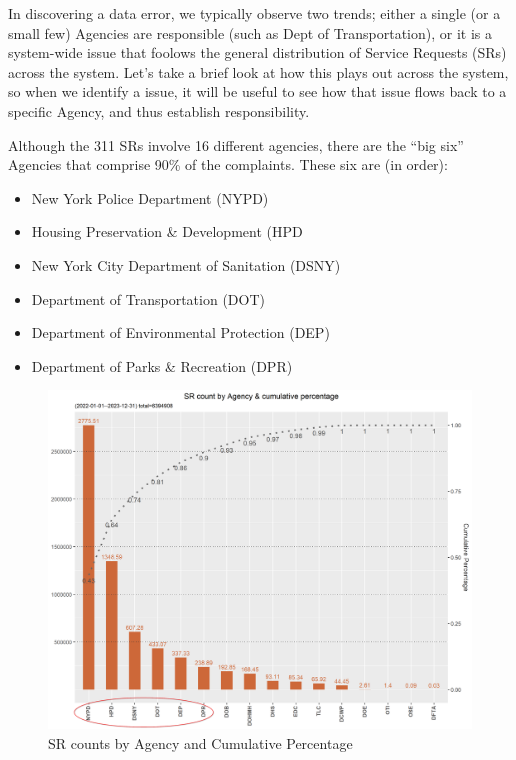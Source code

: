 \documentclass[12pt, titlepage]{article}
\begin{document}
In discovering a data error, we typically observe two trends; either a single (or a small few) Agencies are responsible (such as Dept of Transportation), or it is a system-wide issue that foolows the general distribution
of  Service Requests (SRs) across the system. Let's take a brief look at how this plays out across the system, so when we identify a
issue, it will be useful to see how that issue flows back to a specific Agency, and thus establish responsibility.

Although the 311 SRs involve 16 different agencies, there are the ``big six'' Agencies that comprise
90\% of the complaints. These six are (in order):  

\begin{itemize}
	\item New York Police Department (NYPD)
	\item Housing Preservation \& Development (HPD
	\item New York City Department of Sanitation (DSNY)
	\item Department of Transportation (DOT)
	\item Department of Environmental Protection (DEP)
	\item Department of Parks \& Recreation (DPR)
\end{itemize}

\begin{figure}[htbp]
  \centering
	  \includegraphics[width=\textwidth]{SRs_by_Agency.png}
	  \caption{SR counts by Agency and Cumulative Percentage}
	  \label{fig:SR_counts_by_Agency}
\end{figure}
\end{document}
